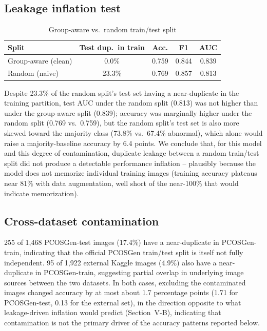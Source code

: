 \documentclass[conference]{IEEEtran}
\begin{document}
\subsection{Leakage inflation test}

\begin{table}[t]
\centering
\caption{Group-aware vs.\ random train/test split}
\label{tab:leakage}
\begin{tabular}{@{}lcccc@{}}
\toprule
Split & Test dup.\ in train & Acc. & F1 & AUC \\
\midrule
Group-aware (clean) & 0.0\% & 0.759 & 0.844 & 0.839 \\
Random (naive) & 23.3\% & 0.769 & 0.857 & 0.813 \\
\bottomrule
\end{tabular}
\end{table}

Despite 23.3\% of the random split's test set having a near-duplicate in the training partition, test AUC under the random split (0.813) was not higher than under the group-aware split (0.839); accuracy was marginally higher under the random split (0.769 vs.\ 0.759), but the random split's test set is also more skewed toward the majority class (73.8\% vs.\ 67.4\% abnormal), which alone would raise a majority-baseline accuracy by 6.4 points. We conclude that, for this model and this degree of contamination, duplicate leakage between a random train/test split did not produce a detectable performance inflation -- plausibly because the model does not memorize individual training images (training accuracy plateaus near 81\% with data augmentation, well short of the near-100\% that would indicate memorization).

\subsection{Cross-dataset contamination}

255 of 1,468 PCOSGen-test images (17.4\%) have a near-duplicate in PCOSGen-train, indicating that the official PCOSGen train/test split is itself not fully independent. 95 of 1,922 external Kaggle images (4.9\%) also have a near-duplicate in PCOSGen-train, suggesting partial overlap in underlying image sources between the two datasets. In both cases, excluding the contaminated images changed accuracy by at most about 1.7 percentage points (1.71 for PCOSGen-test, 0.13 for the external set), in the direction opposite to what leakage-driven inflation would predict (Section~V-B), indicating that contamination is not the primary driver of the accuracy patterns reported below.
\end{document}
